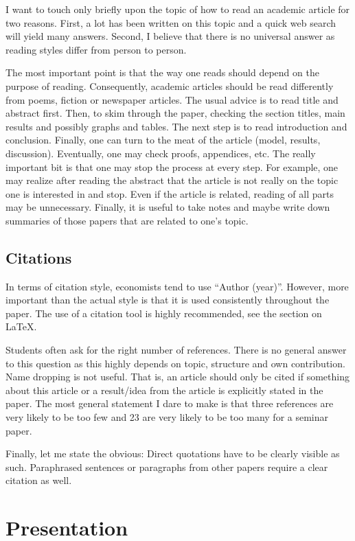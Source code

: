 \documentclass[a4paper,11pt]{article}
\begin{document}
I want to touch only briefly upon the topic of how to read an academic article for two reasons. First, a lot has been written on this topic and a quick web search will yield many answers. Second, I believe that there is no universal answer as reading styles differ from person to person.

The most important point is that the way one reads should depend on the purpose of reading. Consequently, academic articles should be read differently from poems, fiction or newspaper articles. The usual advice is to read title and abstract first. Then, to skim through the paper, checking the section titles, main results and possibly graphs and tables. The next step is to read introduction and conclusion. Finally, one can turn to the meat of the article (model, results, discussion). Eventually, one may check proofs, appendices, etc. The really important bit is that one may stop the process at every step. For example, one may realize after reading the abstract that the article is not really on the topic one is interested in and stop. Even if the article is related, reading of all parts may be unnecessary. Finally, it is useful to take notes and maybe write down summaries of those papers that are related to one's topic.

\subsection{Citations}
\label{sec:citations}

In terms of citation style, economists tend to use ``Author (year)''. However, more important than the actual style is that it is used consistently throughout the paper. The use of a citation tool is highly recommended, see the section on \LaTeX.

Students often ask for the right number of references. There is no general answer to this question as this highly depends on topic, structure and own contribution. Name dropping is not useful. That is, an article should only be cited if something about this article or a result/idea from the article is explicitly stated in the paper. The most general statement I dare to make is that three references are very likely to be too few and 23 are very likely to be too many for a seminar paper.

Finally, let me state the obvious: Direct quotations have to be clearly visible as such. Paraphrased sentences or paragraphs from other papers require a clear citation as well.

\section{Presentation}
\label{sec:presentation}
\end{document}
